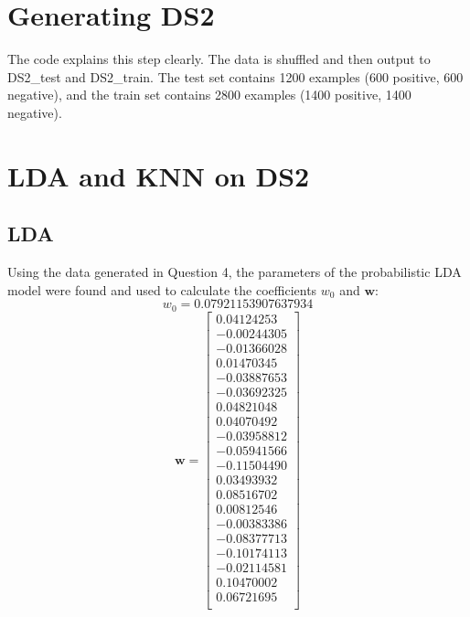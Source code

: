 \documentclass{article}
\begin{document}
\section{Generating DS2}
The code explains this step clearly. The data is shuffled and then output to DS2\_test and DS2\_train. The test set contains 1200 examples (600 positive, 600 negative), and the train set contains 2800 examples (1400 positive, 1400 negative).

\section{LDA and KNN on DS2}
\subsection{LDA}
Using the data generated in Question 4, the parameters of the probabilistic LDA model were found and used to calculate the coefficients \(w_0\) and \(\mathbf{w}\):\\

\[w_0 = 0.07921153907637934\]
\begin{equation}
	\mathbf{w}=
	\begin{bmatrix}
		 0.04124253 \\
        -0.00244305 \\
        -0.01366028 \\
         0.01470345 \\
        -0.03887653 \\
        -0.03692325 \\
         0.04821048 \\
         0.04070492 \\
        -0.03958812 \\
        -0.05941566 \\
        -0.11504490 \\
         0.03493932 \\
         0.08516702 \\
         0.00812546 \\
        -0.00383386 \\
        -0.08377713 \\
        -0.10174113 \\
        -0.02114581 \\
         0.10470002 \\
         0.06721695 \\
	\end{bmatrix}
\end{equation}
\end{document}
